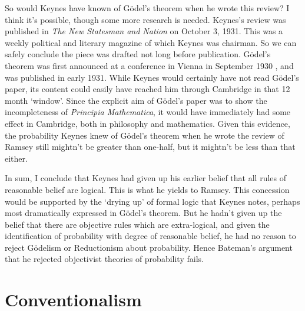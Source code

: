 So would Keynes have known of G\"{o}del's theorem when he wrote this review? I think it's possible, though some more research is needed. Keynes's review was published in \textit{The New Statesman and Nation }on October 3, 1931. This was a weekly political and literary magazine of which Keynes was chairman. So we can safely conclude the piece was drafted not long before publication. G\"{o}del's theorem was first announced at a conference in Vienna in September 1930 \citep{Wang1987}, and was published in early 1931. While Keynes would certainly have not read G\"{o}del's paper, its content could easily have reached him through Cambridge in that 12 month `window'. Since the explicit aim of G\"{o}del's paper was to show the incompleteness of \textit{Principia Mathematica}, it would have immediately had some effect in Cambridge, both in philosophy and mathematics. Given this evidence, the probability Keynes knew of G\"{o}del's theorem when he wrote the review of Ramsey still mightn't be greater than one-half, but it mightn't be less than that either.

In sum, I conclude that Keynes had given up his earlier belief that all rules of reasonable belief are logical. This is what he yields to Ramsey. This concession would be supported by the `drying up' of formal logic that Keynes notes, perhaps most dramatically expressed in G\"{o}del's theorem. But he hadn't given up the belief that there are objective rules which are extra-logical, and given the identification of probability with degree of reasonable belief, he had no reason to reject G\"{o}delism or Reductionism about probability. Hence Bateman's argument that he rejected objectivist theories of probability fails.

\section{Conventionalism}


